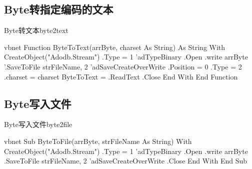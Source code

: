 \subsection{Byte转指定编码的文本}
\begin{codebox}{Byte转文本}{byte2text}
	\begin{amzcode}{vbnet}
		Function ByteToText(arrByte, charset As String) As String
			With CreateObject("Adodb.Stream")
				.Type = 1 'adTypeBinary
				.Open
				.write arrByte
				'.SaveToFile strFileName, 2 'adSaveCreateOverWrite
				.Position = 0
				.Type = 2
				.charset = charset
				ByteToText = .ReadText
				.Close
			End With
		End Function
	\end{amzcode}
\end{codebox}

\subsection{Byte写入文件}
\begin{codebox}{Byte写入文件}{byte2file}
	\begin{amzcode}{vbnet}
		Sub ByteToFile(arrByte, strFileName As String)
			With CreateObject("Adodb.Stream")
				.Type = 1 'adTypeBinary
				.Open
				.write arrByte
				.SaveToFile strFileName, 2 'adSaveCreateOverWrite
				.Close
			End With
		End Sub
	\end{amzcode}
\end{codebox}
